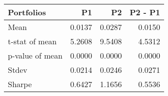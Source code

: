 \begin{tabular}{lrrr}
\toprule
Portfolios & P1 & P2 & P2 - P1 \\
\midrule
Mean & 0.0137 & 0.0287 & 0.0150 \\
t-stat of mean & 5.2608 & 9.5408 & 4.5312 \\
p-value of mean & 0.0000 & 0.0000 & 0.0000 \\
Stdev & 0.0214 & 0.0246 & 0.0271 \\
Sharpe & 0.6427 & 1.1656 & 0.5536 \\
\bottomrule
\end{tabular}
